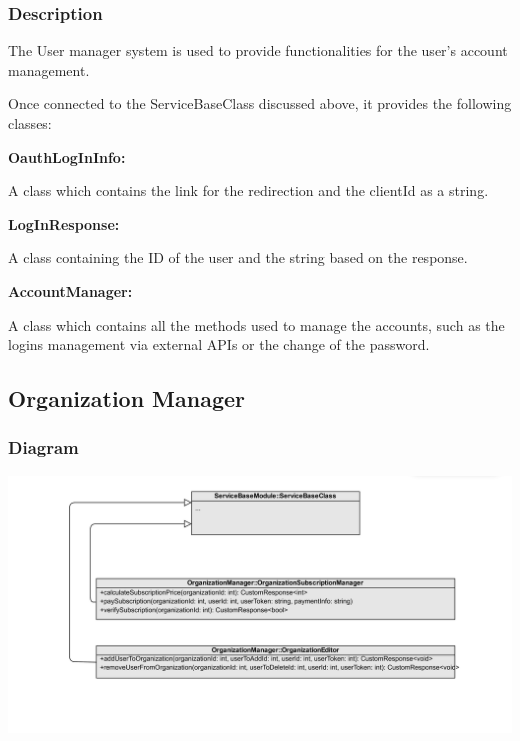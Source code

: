 \documentclass{article}
\begin{document}
\subsubsection{Description}

The User manager system is used to provide functionalities for the user's account management.

Once connected to the ServiceBaseClass discussed above, it provides the following classes:

  \item \textbf{OauthLogInInfo: }
  
  A class which contains the link for the redirection and the clientId as a string.

  \item \textbf{LogInResponse: }
  
  A class containing the ID of the user and the string based on the response.

  \item \textbf{AccountManager: }

  A class which contains all the methods used to manage the accounts, such as the logins management via external APIs or the change of the password.

\subsection{Organization Manager}

\subsubsection{Diagram}
\includegraphics[width=\textwidth,height=\textheight,keepaspectratio]{images/class_diagram/OrganizationManager.jpg}
\end{document}

